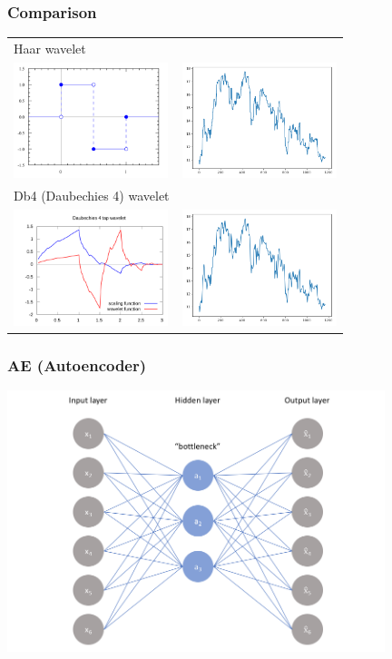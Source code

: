 \documentclass{beamer}
\begin{document}
\begin{frame}
\frametitle{Comparison}
\begin{center}
\begin{tabular}{l r}
Haar wavelet\\
\includegraphics[width=4.5cm]{haar_wavelet.png} & \includegraphics[width=4.5cm]{after_denoising_haar.png} \\
Db4 (Daubechies 4) wavelet \\
\includegraphics[width=4.5cm]{db4_wavelet.png} & \includegraphics[width=4.5cm]{after_denoising_db4.png} \\
\end{tabular}
\end{center}
\end{frame}

\begin{frame}
\frametitle{AE (Autoencoder)}
\includegraphics[width=11cm]{sae1.png}
\end{frame}
\end{document}
